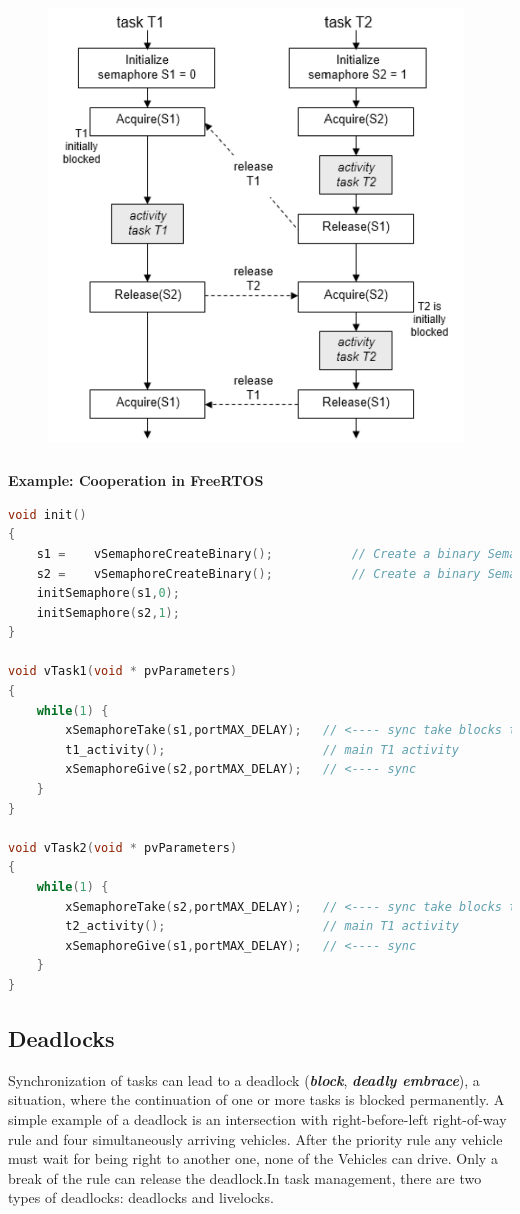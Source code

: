  	\begin{figure}[h]
    \centering
    \includegraphics[width=11cm, height=12cm]{Images/image107.png}
    \label{fig:Fig 53}
    \end{figure}
\newpage
\textbf{Example: Cooperation in FreeRTOS  }

\begin{lstlisting}[style=mystyle, language=c]
void init()
{
	s1 =	vSemaphoreCreateBinary();			// Create a binary Semaphore 
	s2 =	vSemaphoreCreateBinary();			// Create a binary Semaphore 
	initSemaphore(s1,0);  	
	initSemaphore(s2,1);
}

void vTask1(void * pvParameters)
{
	while(1) {
		xSemaphoreTake(s1,portMAX_DELAY);	// <---- sync take blocks task !
		t1_activity();						// main T1 activity
		xSemaphoreGive(s2,portMAX_DELAY);	// <---- sync 
 	}
}

void vTask2(void * pvParameters)
{
	while(1) {
		xSemaphoreTake(s2,portMAX_DELAY);	// <---- sync take blocks task !
		t2_activity();						// main T1 activity
		xSemaphoreGive(s1,portMAX_DELAY);	// <---- sync 
 	}
}
\end{lstlisting}

\subsection{Deadlocks}

Synchronization of tasks can lead to a deadlock (\textbf{\textit{block}}, \textbf{\textit{deadly embrace}}), a situation, where the continuation of one or more tasks is blocked permanently. A simple example of a deadlock is an intersection with right-before-left right-of-way rule and four simultaneously arriving vehicles. After the priority rule any vehicle must wait for being right to another one, none of the Vehicles can drive. Only a break of the rule can release the deadlock.In task management, there are two types of deadlocks: deadlocks and livelocks.\\

